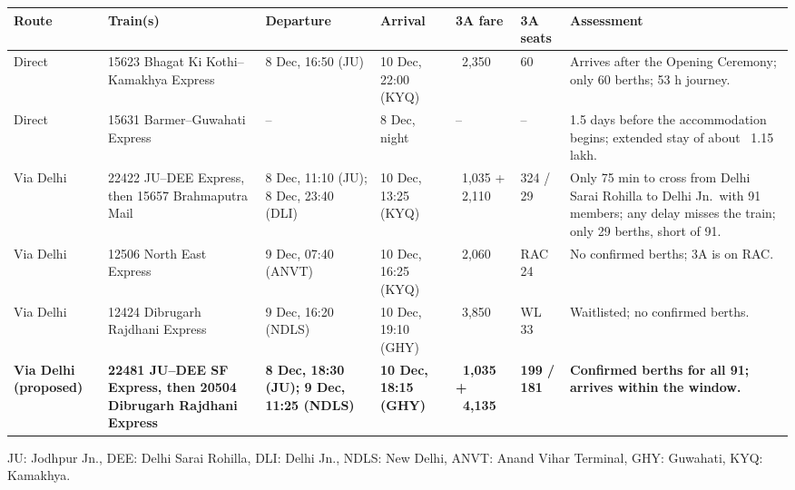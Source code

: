 \documentclass[11pt,letterpaper]{article}
\newcommand{\rs}{{\rupee}}
\begin{document}
{\small\setlength{\tabcolsep}{4pt}
\begin{longtable}{|L{1.9cm}|L{2.9cm}|L{2.1cm}|L{2.0cm}|R{1.5cm}|C{1.2cm}|L{2.8cm}|}
\hline
\textbf{Route} & \textbf{Train(s)} & \textbf{Departure} & \textbf{Arrival} & \textbf{3A fare} & \textbf{3A seats} & \textbf{Assessment} \\ \hline
\endhead
Direct & 15623 Bhagat Ki Kothi--Kamakhya Express & 8 Dec, 16:50 (JU) & 10 Dec, 22:00 (KYQ) & \rs~2,350 & 60 & Arrives after the Opening Ceremony; only 60 berths; 53 h journey. \\ \hline
Direct & 15631 Barmer--Guwahati Express & -- & 8 Dec, night & -- & -- & 1.5 days before the accommodation begins; extended stay of about \rs~1.15 lakh. \\ \hline
Via Delhi & 22422 JU--DEE Express, then 15657 Brahmaputra Mail & 8 Dec, 11:10 (JU); 8 Dec, 23:40 (DLI) & 10 Dec, 13:25 (KYQ) & \rs~1,035 + \rs~2,110 & 324 / 29 & Only 75 min to cross from Delhi Sarai Rohilla to Delhi Jn.\ with 91 members; any delay misses the train; only 29 berths, short of 91. \\ \hline
Via Delhi & 12506 North East Express & 9 Dec, 07:40 (ANVT) & 10 Dec, 16:25 (KYQ) & \rs~2,060 & RAC 24 & No confirmed berths; 3A is on RAC. \\ \hline
Via Delhi & 12424 Dibrugarh Rajdhani Express & 9 Dec, 16:20 (NDLS) & 10 Dec, 19:10 (GHY) & \rs~3,850 & WL 33 & Waitlisted; no confirmed berths. \\ \hline
\textbf{Via Delhi (proposed)} & \textbf{22481 JU--DEE SF Express, then 20504 Dibrugarh Rajdhani Express} & \textbf{8 Dec, 18:30 (JU); 9 Dec, 11:25 (NDLS)} & \textbf{10 Dec, 18:15 (GHY)} & \textbf{\rs~1,035 + \rs~4,135} & \textbf{199 / 181} & \textbf{Confirmed berths for all 91; arrives within the window.} \\ \hline
\end{longtable}}

{\small JU: Jodhpur Jn., DEE: Delhi Sarai Rohilla, DLI: Delhi Jn., NDLS: New Delhi, ANVT: Anand Vihar Terminal, GHY: Guwahati, KYQ: Kamakhya.}
\end{document}

